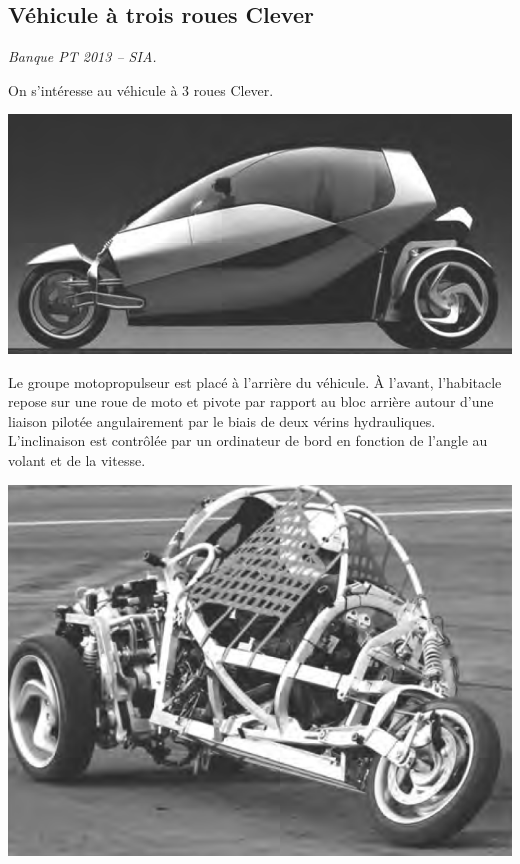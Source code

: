 \documentclass[10pt,fleqn]{article} %
\begin{document}

\vspace{4.5cm}
\pagestyle{fancy}
\thispagestyle{plain}


\def\columnseprulecolor{\color{ocre}}
\setlength{\columnseprule}{0.4pt} 

\ifprof
\else
\begin{multicols}{2}
\fi

\subsection*{Véhicule à trois roues Clever}
\begin{flushright}
\textit{Banque PT 2013 -- SIA.}
\end{flushright}
On s'intéresse au véhicule à 3 roues Clever.

\ifprof
\else
\begin{center}
\includegraphics[width=.8\linewidth]{images/fig_01}
\end{center}

 Le groupe motopropulseur est placé à l'arrière du véhicule. À l’avant, l’habitacle repose sur une roue de moto et pivote par rapport au bloc arrière autour d’une liaison pilotée angulairement par le biais de deux vérins hydrauliques. L'inclinaison est contrôlée par un ordinateur de bord en fonction de l'angle au volant et de la vitesse. 

\begin{center}
\includegraphics[width=.8\linewidth]{images/fig_02}
\end{center}


\end{multicols}
\end{document}
